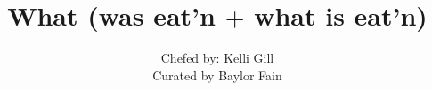 \documentclass[9pt]{book}
\makeatletter
\def\subtitle#1{\gdef\@subtitle{#1}}
\newenvironment{VertCenter}{\clearpage\setlength{\topskip}{0pt}%
    \newgeometry{vmargin=0cm,ignoreheadfoot}%
    \thispagestyle{empty}%
    \vspace*{\fill}\nointerlineskip}%
    {\vspace*{\fill}}
\makeatother
\begin{document}
\frontmatter
\title{What (was eat'n $+$ what is eat'n)}
\subtitle{}
\author{Chefed by: Kelli Gill\\
        Curated by Baylor Fain}
\date{}
\maketitle

\clearpage
\thispagestyle{empty}

\renewcommand{\contentsname}{}
\tableofcontents


\mainmatter




\end{document}
